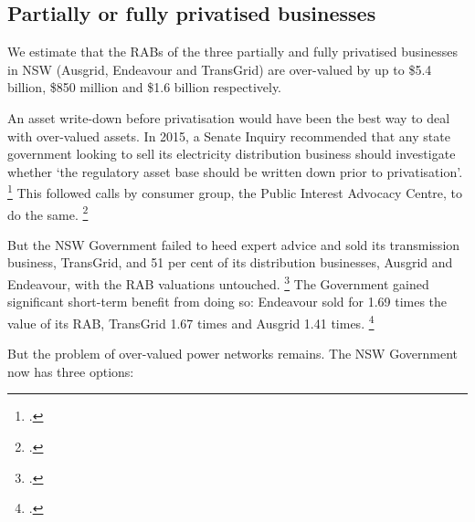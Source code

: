 \documentclass[FrontPage]{grattan}
\begin{document}
\subsection{Partially or fully privatised businesses}
We estimate that the RABs of the three partially and fully privatised businesses in NSW (Ausgrid, Endeavour and TransGrid) are over-valued by up to \$5.4 billion, \$850 million and \$1.6 billion respectively. 

An asset write-down before privatisation would have been the best way to deal with over-valued assets. In 2015, a Senate Inquiry recommended that any state government looking to sell its electricity distribution business should investigate whether `the regulatory asset base should be written down prior to privatisation'.%
\footcite{Parliament2015PerformanceManagementNetwork}
This followed calls by consumer group, the Public Interest Advocacy Centre, to do the same.%
\footcite{Derum2014NecessityandComplexity}

But the NSW Government failed to heed expert advice and sold its transmission business, TransGrid, and 51 per cent of its distribution businesses, Ausgrid and Endeavour, with the RAB valuations untouched.%
\footcite{AFR2017NSWsellsEndeavour}
The Government gained significant short-term benefit from doing so: Endeavour sold for 1.69 times the value of its RAB, TransGrid 1.67 times and Ausgrid 1.41 times.%
\footcite{Morgans2017UtilitiesSales}
 
But the problem of over-valued power networks remains. The NSW Government now has three options:
\end{document}
